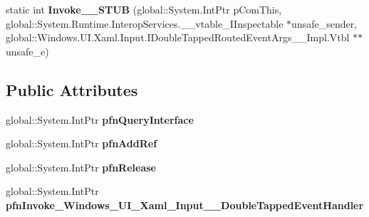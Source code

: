 \begin{DoxyCompactItemize}
\item 
\mbox{\label{struct_windows_1_1_u_i_1_1_xaml_1_1_input_1_1_double_tapped_event_handler_____impl_1_1_vtbl_ad16fd73d829f1fc61ff0c531c9f35d0c}} 
static int {\bfseries Invoke\+\_\+\+\_\+\+S\+T\+UB} (global\+::\+System.\+Int\+Ptr p\+Com\+This, global\+::\+System.\+Runtime.\+Interop\+Services.\+\_\+\+\_\+vtable\+\_\+\+I\+Inspectable $\ast$unsafe\+\_\+sender, global\+::\+Windows.\+U\+I.\+Xaml.\+Input.\+I\+Double\+Tapped\+Routed\+Event\+Args\+\_\+\+\_\+\+Impl.\+Vtbl $\ast$$\ast$unsafe\+\_\+e)
\end{DoxyCompactItemize}
\subsection*{Public Attributes}
\begin{DoxyCompactItemize}
\item 
\mbox{\label{struct_windows_1_1_u_i_1_1_xaml_1_1_input_1_1_double_tapped_event_handler_____impl_1_1_vtbl_abd1e921a98ef6ee6798471d2150cdea2}} 
global\+::\+System.\+Int\+Ptr {\bfseries pfn\+Query\+Interface}
\item 
\mbox{\label{struct_windows_1_1_u_i_1_1_xaml_1_1_input_1_1_double_tapped_event_handler_____impl_1_1_vtbl_ad6bb77c4386d92980999bd7151fb9bc7}} 
global\+::\+System.\+Int\+Ptr {\bfseries pfn\+Add\+Ref}
\item 
\mbox{\label{struct_windows_1_1_u_i_1_1_xaml_1_1_input_1_1_double_tapped_event_handler_____impl_1_1_vtbl_aa20d80553e722c9ac447fb69278a7f68}} 
global\+::\+System.\+Int\+Ptr {\bfseries pfn\+Release}
\item 
\mbox{\label{struct_windows_1_1_u_i_1_1_xaml_1_1_input_1_1_double_tapped_event_handler_____impl_1_1_vtbl_ab74d669a9b039d8aa6215b9fb98e788a}} 
global\+::\+System.\+Int\+Ptr {\bfseries pfn\+Invoke\+\_\+\+Windows\+\_\+\+U\+I\+\_\+\+Xaml\+\_\+\+Input\+\_\+\+\_\+\+Double\+Tapped\+Event\+Handler}
\end{DoxyCompactItemize}
